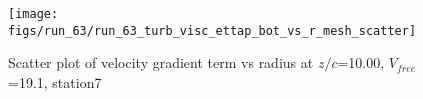 \begin{figure}[H]
\centering
\texttt{[image: figs/run\_63/run\_63\_turb\_visc\_ettap\_bot\_vs\_r\_mesh\_scatter]}
\caption{Scatter plot of velocity gradient term vs radius at $z/c$=10.00, $V_{free}$=19.1, station7}
\label{fig:run_63_turb_visc_ettap_bot_vs_r_mesh_scatter}
\end{figure}


